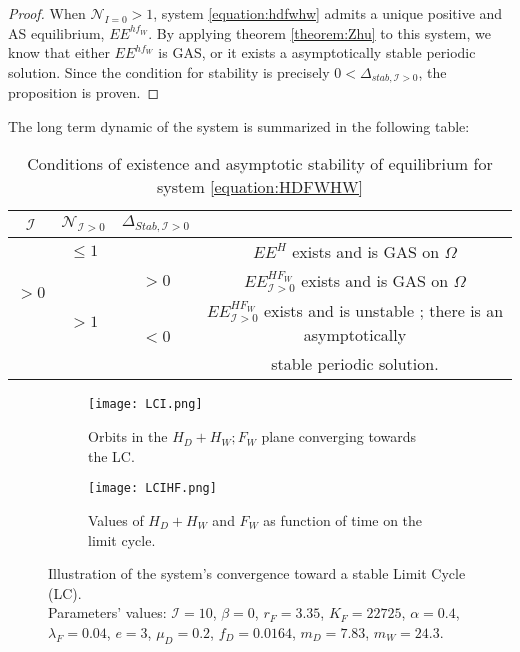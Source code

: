 \documentclass{article}
\newcommand{\lfw}{\lambda_{F}}
\newcommand{\lfw}{\lambda_{F}}
\newcommand{\cI}{\mathcal{I}}
\theoremstyle{definition}
\theoremstyle{remark}
\begin{document}
\begin{proof}
When $\mathcal{N}_{I =0} > 1$, system \eqref{equation:hdfwhw} admits a unique positive and AS equilibrium, $EE^{hf_W}$. By applying theorem \ref{theorem:Zhu} to this system, we know that either $EE^{hf_W}$ is GAS, or it exists a asymptotically stable periodic solution. Since the condition for stability is precisely $0 < \Delta_{stab, \cI > 0}$, the proposition is proven. 
\end{proof}


The long term dynamic of the system is summarized in the following table:
\begin{table}[!ht]
\def\arraystretch{2}
\centering
\begin{tabular}{c|c|c|c}
$\cI$ & $\mathcal{N}_{\cI > 0} $ & $\Delta_{Stab, \cI > 0}$ & \\
\hline
\multirow{3}{*}{$>0$} & $\leq1$ & &$EE^{H}$ exists and is GAS on $\Omega$ \\
\cline{2-4}
 & \multirow{3}{*}{$> 1$}  & $>0$ &$EE^{HF_W}_{\cI>0}$ exists and is GAS on $\Omega$ \\
 \cline{3-4}
 & & \multirow{2}{*}{$ < 0$} & $EE^{HF_W}_{\cI>0}$ exists and is unstable ; there is an asymptotically \\
 & & &  stable periodic solution. \\
\end{tabular}
\caption{\centering Conditions of existence and asymptotic stability of equilibrium for system \eqref{equation:HDFWHW}}
\label{table:long term dynamic, I > 0}
\end{table}

\begin{figure}[!ht]
\begin{subfigure}{0.45\textwidth}
\centering
\texttt{[image: LCI.png]}
\caption{\centering Orbits in the $H_D + H_W ; F_W$ plane converging towards the LC.}
\label{fig:LCI, 1}
\end{subfigure}
\begin{subfigure}{0.45\textwidth}
\centering
\texttt{[image: LCIHF.png]}
\caption{\centering Values of $H_D + H_W$ and $F_W$ as function of time on the limit cycle.}
\label{fig:LCI, 2}
\end{subfigure}
\caption{ Illustration of the system's convergence toward a stable Limit Cycle (LC). \\
Parameters' values: $\cI = 10$, $\beta = 0$, $r_F = 3.35$, $K_F = 22725$, $\alpha = 0.4$, $\lfw = 0.04$, $e = 3$, $\mu_D = 0.2$, $f_D = 0.0164$, $m_D = 7.83$, $m_W = 24.3$.}
\end{figure}
\end{document}
